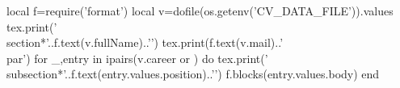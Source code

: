 \documentclass{article}
\begin{document}
\begin{luacode*}
local f=require('format')
local v=dofile(os.getenv('CV_DATA_FILE')).values
tex.print('\\section*{'..f.text(v.fullName)..'}')
tex.print(f.text(v.mail)..'\\par')
for _,entry in ipairs(v.career or {}) do
 tex.print('\\subsection*{'..f.text(entry.values.position)..'}')
 f.blocks(entry.values.body)
end
\end{luacode*}
\end{document}
